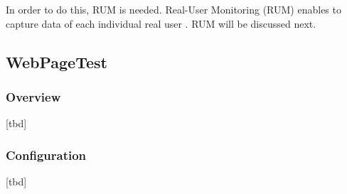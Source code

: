 In order to do this, RUM is needed.
Real-User Monitoring (RUM) enables to capture data of each individual real user .
RUM will be discussed next.
















\subsection{WebPageTest}




\subsubsection{Overview}

[tbd]




\subsubsection{Configuration}

[tbd]

